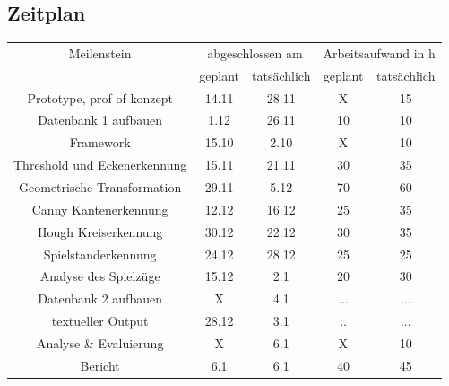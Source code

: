 \documentclass[paper=A4, deutsch]{scrartcl}
\begin{document}
\subsection{Zeitplan}

\begin{table}[h!]
	\centering
	\begin{tabular}{|c|c|c|c|c|}
		\hline
		Meilenstein & \multicolumn{2}{c|}{abgeschlossen am} & \multicolumn{2}{c|}{Arbeitsaufwand in h}\\
		\cline{2-5}
		 & geplant & tatsächlich & geplant & tatsächlich\\
		\hline
				Prototype, prof of konzept & 14.11 & 28.11 & X & 15\\
		\hline
				Datenbank 1 aufbauen & 1.12 & 26.11 & 10 & 10\\
		\hline
				Framework &15.10 &2.10 & X & 10\\
		\hline	
				Threshold und Eckenerkennung & 15.11 & 21.11 & 30 &35\\
		\hline	
				Geometrische Transformation & 29.11 & 5.12 & 70 &60\\
		\hline	
				Canny Kantenerkennung & 12.12 & 16.12 & 25 & 35\\
		\hline	
				Hough Kreiserkennung & 30.12 & 22.12 & 30 & 35\\
		\hline	
				Spielstanderkennung & 24.12 & 28.12 & 25 & 25\\
		\hline	
				Analyse des Spielzüge & 15.12 & 2.1 &20 &30\\
		\hline	
				Datenbank 2 aufbauen & X & 4.1 &... &...\\
		\hline
				textueller Output & 28.12 &  3.1 &..&... \\
		\hline 
				Analyse \& Evaluierung & X & 6.1 & X & 10\\
		\hline
				Bericht & 6.1 & 6.1 & 40 & 45\\
		\hline
	\end{tabular}
\end{table}

\end{document}
